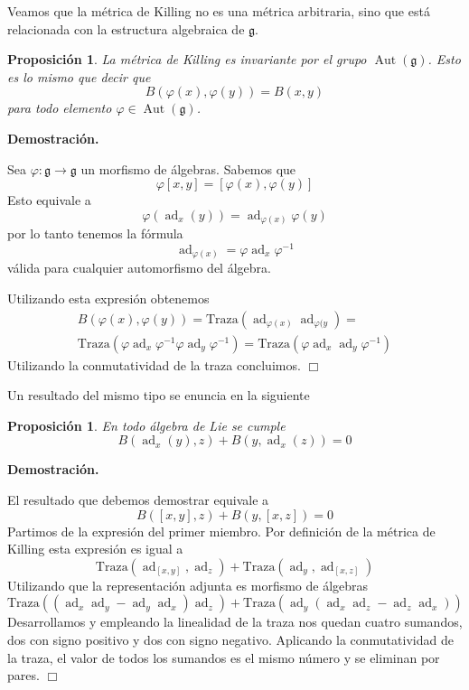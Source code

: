 \documentclass[a4paper,draft,12pt]{scrartcl}
\newtheorem{propo}[teo]{Proposición}%
\newcommand{\dem}{\noindent \textbf{Demostración. }\vspace{0.3 cm}}%
\newcommand{\g}{\mathfrak{g}}%
\newcommand{\fin}{ $\Box $ \vspace{0.4 cm}}
\DeclareMathOperator{\Aut}{Aut}%
\DeclareMathOperator{\ad}{ad}  %
\begin{document}
Veamos que la métrica de Killing no es una métrica arbitraria, sino que está relacionada con la estructura algebraica de $\g$.

\begin{propo}

La métrica de Killing  es invariante por el grupo $\Aut(\g)$.  Esto es lo mismo que decir que 
$$
B(\varphi(x),\varphi(y))= B(x,y)
$$
para todo elemento $\varphi \in \Aut(\g)$.

\end{propo}

\dem

Sea $\varphi: \g \rightarrow \g$ un morfismo de álgebras.  Sabemos que 
$$
\varphi[x,y]= [\varphi(x), \varphi(y)]
$$
  Esto equivale a
$$
\varphi(\ad_x(y))= \ad_{\varphi(x)} \varphi (y)
$$
por lo tanto tenemos la fórmula
$$
\ad_{\varphi(x)}= \varphi \ad_x \varphi^{-1}
$$
válida para cualquier automorfismo del álgebra.

Utilizando esta expresión obtenemos
\begin{equation}\nonumber
\begin{split}
B(\varphi(x),\varphi(y))= \mathrm{Traza}(\ad_{\varphi(x)} \ad_{\varphi(y}) =\\ \nonumber
\mathrm{Traza} ( \varphi \ad_x \varphi^{-1}  \varphi \ad_y \varphi^{-1})=  \mathrm{Traza}(\varphi \ad_x  \ad_y \varphi^{-1})
\end{split}
\end{equation}
Utilizando la conmutatividad de la traza concluimos. \fin 

Un resultado del mismo tipo se enuncia en la siguiente 

\begin{propo}

En todo álgebra de Lie se cumple
$$
B(\ad_x(y), z)+ B (y, \ad_x(z))=0
$$

\end{propo}

\dem

El resultado que debemos demostrar equivale a 
$$
B([x,y],z)+B(y,[x,z])=0
$$
Partimos de la expresión del primer miembro.  Por definición de la métrica de Killing esta expresión es igual a 
$$
\mathrm{Traza}(\ad_{[x,y]},\ad_z) + \mathrm{Traza}(\ad_y, \ad_{[x,z]})
$$
Utilizando que la representación adjunta es morfismo de álgebras
$$
\mathrm{Traza}((\ad_x \ad_y-\ad_y\ad_x)\ad_z)+ \mathrm{Traza}(\ad_y(\ad_x\ad_z-\ad_z\ad_x))
$$
Desarrollamos y empleando la linealidad de la traza nos quedan cuatro sumandos, dos con signo positivo y dos con signo negativo.  Aplicando la conmutatividad de la traza, el valor de todos los sumandos es el mismo número y se eliminan por pares. \fin
\end{document}
